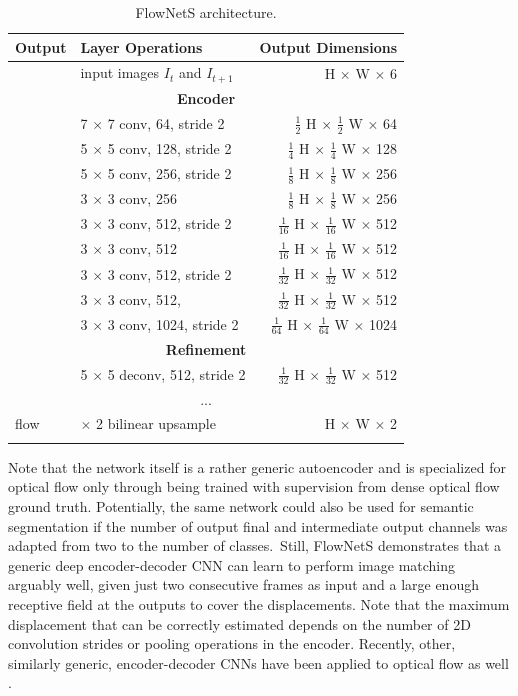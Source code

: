 {
\begin{longtable}{llr}
\toprule
\textbf{Output} & \textbf{Layer Operations} & \textbf{Output Dimensions} \\
\midrule\midrule
 & input images $I_t$ and $I_{t+1}$ & H $\times$ W $\times$ 6 \\
\midrule
\multicolumn{3}{c}{\textbf{Encoder}}\\
\midrule
& 7 $\times$ 7 conv, 64, stride 2 & $\tfrac{1}{2}$ H $\times$ $\tfrac{1}{2}$ W $\times$ 64 \\
& 5 $\times$ 5 conv, 128, stride 2 & $\tfrac{1}{4}$ H $\times$ $\tfrac{1}{4}$ W $\times$ 128 \\
& 5 $\times$ 5 conv, 256, stride 2 & $\tfrac{1}{8}$ H $\times$ $\tfrac{1}{8}$ W $\times$ 256 \\
& 3 $\times$ 3 conv, 256 & $\tfrac{1}{8}$ H $\times$ $\tfrac{1}{8}$ W $\times$ 256 \\
& 3 $\times$ 3 conv, 512, stride 2 & $\tfrac{1}{16}$ H $\times$ $\tfrac{1}{16}$ W $\times$ 512 \\
& 3 $\times$ 3 conv, 512 & $\tfrac{1}{16}$ H $\times$ $\tfrac{1}{16}$ W $\times$ 512 \\
& 3 $\times$ 3 conv, 512, stride 2 & $\tfrac{1}{32}$ H $\times$ $\tfrac{1}{32}$ W $\times$ 512 \\
& 3 $\times$ 3 conv, 512, & $\tfrac{1}{32}$ H $\times$ $\tfrac{1}{32}$ W $\times$ 512 \\
& 3 $\times$ 3 conv, 1024, stride 2 & $\tfrac{1}{64}$ H $\times$ $\tfrac{1}{64}$ W $\times$ 1024 \\
\midrule
\multicolumn{3}{c}{\textbf{Refinement}}\\
& 5 $\times$ 5 deconv, 512, stride 2 & $\tfrac{1}{32}$ H $\times$ $\tfrac{1}{32}$ W $\times$ 512 \\
\multicolumn{3}{c}{...}\\
\midrule
flow & $\times$ 2 bilinear upsample & H $\times$ W $\times$ 2 \\
\bottomrule

\caption {
FlowNetS \cite{FlowNet} architecture.
}
\label{table:flownets}
\end{longtable}


}

Note that the network itself is a rather generic autoencoder and is specialized for optical flow only through being trained
with supervision from dense optical flow ground truth.
Potentially, the same network could also be used for semantic segmentation if
the number of output final and intermediate output channels was adapted from two to the number of classes.\
Still, FlowNetS demonstrates that a generic deep encoder-decoder CNN can learn to perform image matching arguably well,
given just two consecutive frames as input and a large enough receptive field at the outputs to cover the displacements.
Note that the maximum displacement that can be correctly estimated depends on the number of 2D convolution strides or pooling
operations in the encoder.
Recently, other, similarly generic,
encoder-decoder CNNs have been applied to optical flow as well \cite{DenseNetDenseFlow}.

